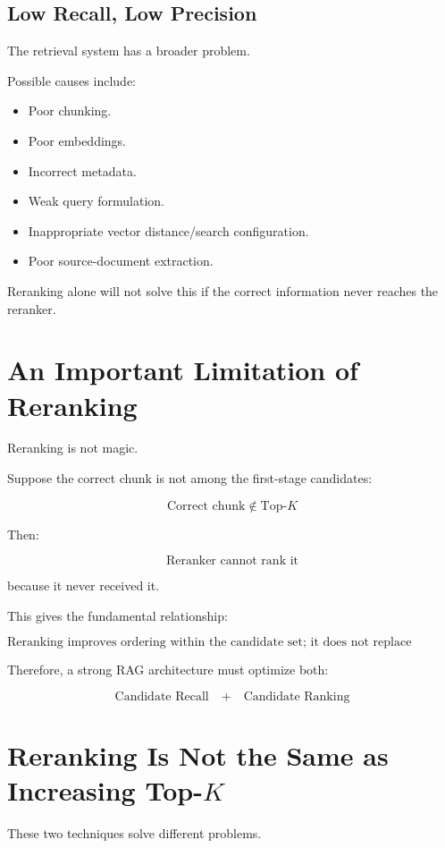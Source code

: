\documentclass[12pt, a4paper]{article}
\begin{document}
\subsection{Low Recall, Low Precision}

The retrieval system has a broader problem.

Possible causes include:

\begin{itemize}
    \item Poor chunking.
    \item Poor embeddings.
    \item Incorrect metadata.
    \item Weak query formulation.
    \item Inappropriate vector distance/search configuration.
    \item Poor source-document extraction.
\end{itemize}

Reranking alone will not solve this if the correct information never reaches the reranker.

\section{An Important Limitation of Reranking}

Reranking is not magic.

Suppose the correct chunk is not among the first-stage candidates:

\[
\text{Correct chunk} \notin \text{Top-}K
\]

Then:

\[
\text{Reranker cannot rank it}
\]

because it never received it.

This gives the fundamental relationship:

\[
\boxed{
\text{Reranking improves ordering within the candidate set;
it does not replace candidate generation.}
}
\]

Therefore, a strong RAG architecture must optimize both:

\[
\text{Candidate Recall}
\quad+\quad
\text{Candidate Ranking}
\]

\section{Reranking Is Not the Same as Increasing Top-$K$}

These two techniques solve different problems.
\end{document}
